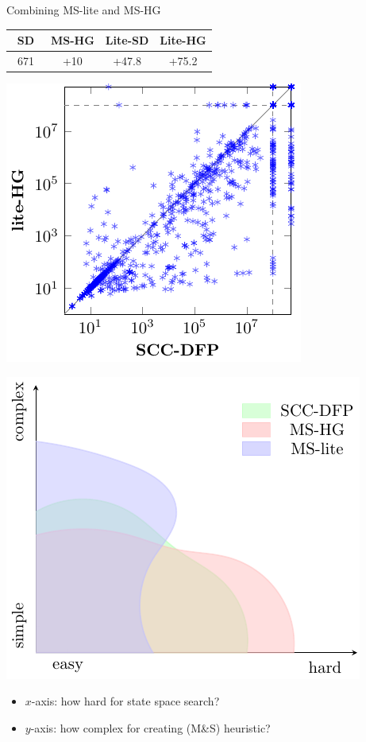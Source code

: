 \begin{myblock}{Combining MS-lite and MS-HG}
\vspace*{0.5in}
\begin{minipage}{0.45\textwidth}
\begin{table}[]
\normalsize
\begin{tabular}{|c|c|c|c|} 
\hline\Tstrut 
 SD & MS-HG & Lite-SD & Lite-HG \\
 \hline\Tstrut 
 \ 671\  & +10 & +47.8 & +75.2 \\
  \hline
\end{tabular}
\end{table}
\hspace*{-0.4in}
\includegraphics[scale=2.5]{pdfs/figure6.pdf}
\end{minipage}
\begin{minipage}{0.5\textwidth}
\includegraphics[scale=2.5]{pdfs/taxonomy.pdf}
\normalsize
\begin{itemize}
\item $x$-axis: how hard for state space search?
\item $y$-axis: how complex for creating (M\&S) heuristic?
\end{itemize}
\end{minipage}


\end{myblock}

%


